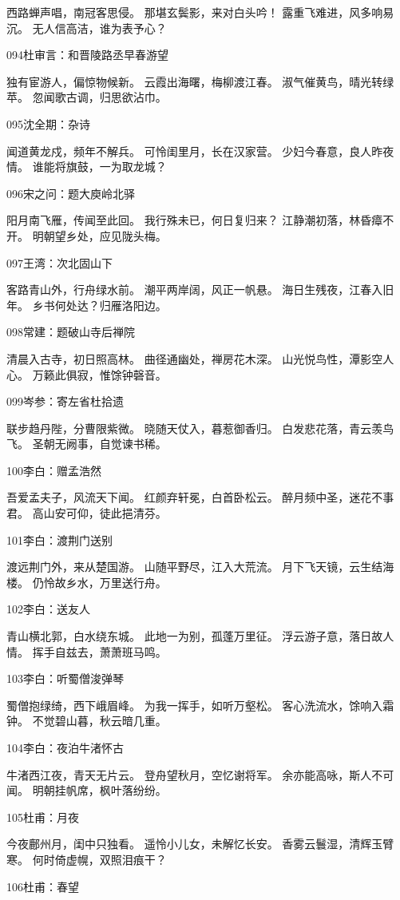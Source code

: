 西路蝉声唱，南冠客思侵。
那堪玄鬓影，来对白头吟！
露重飞难进，风多响易沉。
无人信高洁，谁为表予心？

094杜审言：和晋陵路丞早春游望

独有宦游人，偏惊物候新。
云霞出海曙，梅柳渡江春。
淑气催黄鸟，晴光转绿苹。
忽闻歌古调，归思欲沾巾。

095沈全期：杂诗

闻道黄龙戍，频年不解兵。
可怜闺里月，长在汉家营。
少妇今春意，良人昨夜情。
谁能将旗鼓，一为取龙城？

096宋之问：题大庾岭北驿

阳月南飞雁，传闻至此回。
我行殊未已，何日复归来？
江静潮初落，林昏瘴不开。
明朝望乡处，应见陇头梅。

097王湾：次北固山下

客路青山外，行舟绿水前。
潮平两岸阔，风正一帆悬。
海日生残夜，江春入旧年。
乡书何处达？归雁洛阳边。

098常建：题破山寺后禅院

清晨入古寺，初日照高林。
曲径通幽处，禅房花木深。
山光悦鸟性，潭影空人心。
万籁此俱寂，惟馀钟磬音。

099岑参：寄左省杜拾遗

联步趋丹陛，分曹限紫微。
晓随天仗入，暮惹御香归。
白发悲花落，青云羡鸟飞。
圣朝无阙事，自觉谏书稀。

100李白：赠孟浩然

吾爱孟夫子，风流天下闻。
红颜弃轩冕，白首卧松云。
醉月频中圣，迷花不事君。
高山安可仰，徒此挹清芬。

101李白：渡荆门送别

渡远荆门外，来从楚国游。
山随平野尽，江入大荒流。
月下飞天镜，云生结海楼。
仍怜故乡水，万里送行舟。

102李白：送友人

青山横北郭，白水绕东城。
此地一为别，孤蓬万里征。
浮云游子意，落日故人情。
挥手自兹去，萧萧班马鸣。

103李白：听蜀僧浚弹琴

蜀僧抱绿绮，西下峨眉峰。
为我一挥手，如听万壑松。
客心洗流水，馀响入霜钟。
不觉碧山暮，秋云暗几重。

104李白：夜泊牛渚怀古

牛渚西江夜，青天无片云。
登舟望秋月，空忆谢将军。
余亦能高咏，斯人不可闻。
明朝挂帆席，枫叶落纷纷。

105杜甫：月夜

今夜鄜州月，闺中只独看。
遥怜小儿女，未解忆长安。
香雾云鬟湿，清辉玉臂寒。
何时倚虚幌，双照泪痕干？

106杜甫：春望

